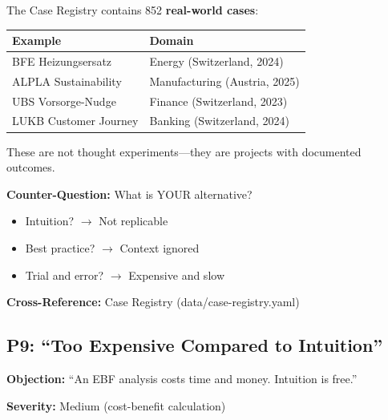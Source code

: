 \begin{axiom}
The Case Registry contains 852 \textbf{real-world cases}:

\begin{center}
\begin{tabular}{ll}
\textbf{Example} & \textbf{Domain} \\
\midrule
BFE Heizungsersatz & Energy (Switzerland, 2024) \\
ALPLA Sustainability & Manufacturing (Austria, 2025) \\
UBS Vorsorge-Nudge & Finance (Switzerland, 2023) \\
LUKB Customer Journey & Banking (Switzerland, 2024) \\
\end{tabular}
\end{center}

These are not thought experiments---they are projects with documented outcomes.

\textbf{Counter-Question:} What is YOUR alternative?
\begin{itemize}[nosep]
    \item Intuition? $\rightarrow$ Not replicable
    \item Best practice? $\rightarrow$ Context ignored
    \item Trial and error? $\rightarrow$ Expensive and slow
\end{itemize}
\end{axiom}

\textbf{Cross-Reference:} Case Registry (data/case-registry.yaml)

\subsection{P9: ``Too Expensive Compared to Intuition''}
\label{sec:da-p9}

\begin{tcolorbox}[colback=gray!5!white, colframe=gray!75!black]
\textbf{Objection:} ``An EBF analysis costs time and money. Intuition is free.''

\textbf{Severity:} Medium (cost-benefit calculation)
\end{tcolorbox}

